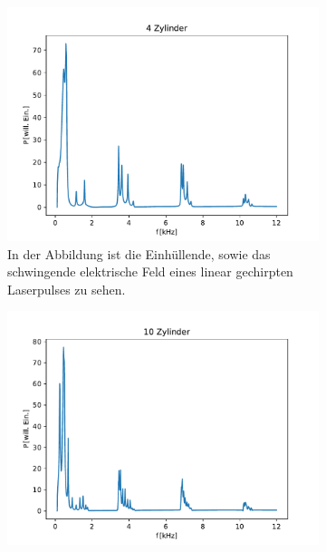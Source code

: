 \begin{figure}[ht]
\begin{subfigure}[b]{0.45\textwidth}
                    \label{fig:1dim_4_Zylinder_10mm}
                \end{subfigure}
                \centering
                \begin{subfigure}[b]{0.45\textwidth}
                    \centering
                    \includegraphics[scale=0.45]{./pictures/1dim_4_Zylinder_13mm.pdf}
                    \caption{In der Abbildung ist die Einhüllende, sowie das schwingende elektrische Feld eines linear gechirpten Laserpulses zu sehen.}
                    \label{fig:1dim_4_Zylinder_13mm}
                \end{subfigure}
                \centering
                \begin{subfigure}[b]{0.45\textwidth}
                    \centering
                    \includegraphics[scale=0.45]{./pictures/1dim_10_Zylinder_10mm.pdf}

\end{subfigure}
\end{figure}
